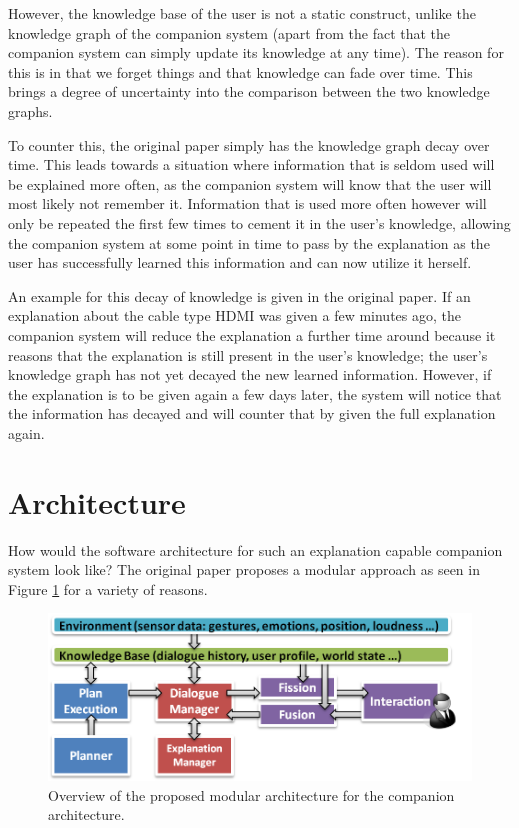 \documentclass[a4paper]{article}
\begin{document}
However, the knowledge base of the user is not a static construct, unlike the knowledge graph of the companion system (apart from the fact that the companion system can simply update its knowledge at any time). The reason for this is in that we forget things and that knowledge can fade over time. This brings a degree of uncertainty into the comparison between the two knowledge graphs.

To counter this, the original paper simply has the knowledge graph decay over time. This leads towards a situation where information that is seldom used will be explained more often, as the companion system will know that the user will most likely not remember it. Information that is used more often however will only be repeated the first few times to cement it in the user's knowledge, allowing the companion system at some point in time to pass by the explanation as the user has successfully learned this information and can now utilize it herself.

An example for this decay of knowledge is given in the original paper. If an explanation about the cable type HDMI was given a few minutes ago, the companion system will reduce the explanation a further time around because it reasons that the explanation is still present in the user's knowledge; the user's knowledge graph has not yet decayed the new learned information. However, if the explanation is to be given again a few days later, the system will notice that the information has decayed and will counter that by given the full explanation again.

\section{Architecture}

How would the software architecture for such an explanation capable companion system look like? The original paper proposes a modular approach as seen in Figure \ref{fig:architecture} for a variety of reasons.

\begin{figure}[H]
	\centering
	\includegraphics[width=12cm]{arch.png}
	\caption{Overview of the proposed modular architecture for the companion architecture.}
	\label{fig:architecture}
\end{figure}
\end{document}
